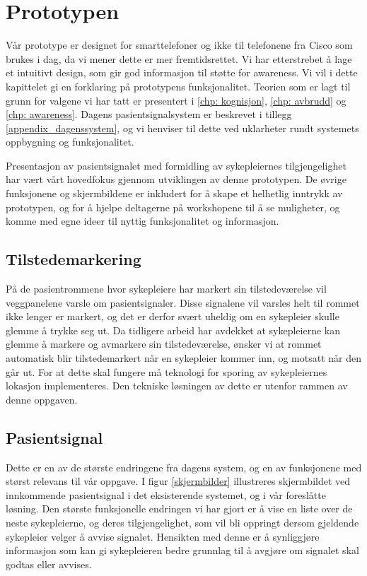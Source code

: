 \section{Prototypen}
\label{prototypen}

Vår prototype er designet for smarttelefoner og ikke til telefonene fra Cisco som brukes i dag, da vi mener dette er mer fremtidsrettet. Vi har etterstrebet å lage et intuitivt design, som gir god informasjon til støtte for awareness. Vi vil i dette kapittelet gi en forklaring på prototypens funksjonalitet. Teorien som er lagt til grunn for valgene vi har tatt er presentert i \ref{chp: kognisjon}, \ref{chp: avbrudd} og \ref{chp: awareness}. Dagens pasientsignalsystem er beskrevet i tillegg \ref{appendix_dagenssystem}, og vi henviser til dette ved uklarheter rundt systemets oppbygning og funksjonalitet.

\noindent
Presentasjon av pasientsignalet med formidling av sykepleiernes tilgjengelighet har vært vårt hovedfokus gjennom utviklingen av denne prototypen. De øvrige funksjonene og skjermbildene er inkludert for å skape et helhetlig inntrykk av prototypen, og for å hjelpe deltagerne på workshopene til å se muligheter, og komme med egne ideer til nyttig funksjonalitet og informasjon.

\subsection{Tilstedemarkering}
På de pasientrommene hvor sykepleiere har markert sin tilstedeværelse vil veggpanelene varsle om pasientsignaler. Disse signalene vil varsles helt til rommet ikke lenger er markert, og det er derfor svært uheldig om en sykepleier skulle glemme å trykke seg ut. Da tidligere arbeid har avdekket at sykepleierne kan glemme å markere og avmarkere sin tilstedeværelse, ønsker vi at rommet automatisk blir tilstedemarkert når en sykepleier kommer inn, og motsatt når den går ut. For at dette skal fungere må teknologi for sporing av sykepleiernes lokasjon implementeres. Den tekniske løsningen av dette er utenfor rammen av denne oppgaven.

\subsection{Pasientsignal}
Dette er en av de største endringene fra dagens system, og en av funksjonene med størst relevans til vår oppgave. I figur \ref{skjermbilder} illustreres skjermbildet ved innkommende pasientsignal i det eksisterende systemet, og i vår foreslåtte løsning. Den største funksjonelle endringen vi har gjort er å vise en liste over de neste sykepleierne, og deres tilgjengelighet, som vil bli oppringt dersom gjeldende sykepleier velger å avvise signalet. Hensikten med denne er å synliggjøre informasjon som kan gi sykepleieren bedre grunnlag til å avgjøre om signalet skal godtas eller avvises.

